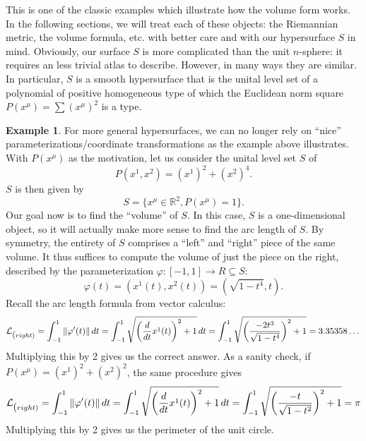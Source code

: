 \documentclass{article}
\theoremstyle{definition}
\newtheorem{exmp}{Example}[section]
\newcommand{\R}{\mathbb{R}}
\newcommand{\lag}{\mathcal{L}}
\newcommand{\f}[2]{\frac{#1}{#2}}
\newcommand{\lp}{\left(}
\newcommand{\rp}{\right)}
\theoremstyle{theorem}
\begin{document}
This is one of the classic examples which illustrate how the volume form works. In the following sections, we will treat each of these objects: the Riemannian metric, the volume formula, etc. with better care and with our hypersurface $S$ in mind. Obviously, our surface $S$ is more complicated than the unit $n$-sphere: it requires an less trivial atlas to describe. However, in many ways they are similar. In particular, $S$ is a smooth hypersurface that is the unital level set of a polynomial of positive homogeneous type of which the Euclidean norm square $P(x^\mu) = \sum (x^\mu)^2$ is a type. 




\begin{exmp}

For more general hypersurfaces, we can no longer rely on ``nice'' parameterizations/coordinate transformations as the example above illustrates. With $P(x^\mu)$ as the motivation, let us consider the unital level set $S$ of 
\begin{equation}
    P(x^1, x^2) = (x^1)^2 + (x^2)^4.
\end{equation}
$S$ is then given by
\begin{equation}
    S = \{ x^\mu \in \R^2, P(x^\mu) = 1 \}. 
\end{equation}
Our goal now is to find the ``volume'' of $S$. In this case, $S$ is a one-dimensional object, so it will actually make more sense to find the arc length of $S$. By symmetry, the entirety of $S$ comprises a ``left'' and ``right'' piece of the same volume. It thus suffices to compute the volume of just the piece on the right, described by the parameterization $\varphi : [-1,1] \to R\subseteq S$:
\begin{equation*}
    \varphi(t) = (x^1(t), x^2(t) ) = (\sqrt{1 - t^4}, t).
\end{equation*}
Recall the arc length formula from vector calculus:
\begin{equation}
    \lag_{\mbox(\tiny{right})} = \int^1_{-1} \norm{\varphi'(t)}\,dt = \int^1_{-1} \sqrt{ \lp \f{d}{dt} x^1(t) \rp^2  + 1 }\,dt = \int^1_{-1} \sqrt{ \lp \f{-2t^3}{\sqrt{1-t^4}} \rp^2 + 1} = 3.35358\dots
\end{equation}
Multiplying this by 2 gives us the correct answer. As a sanity check, if $P(x^\mu) = (x^1)^2 + (x^2)^2$, the same procedure gives 
\begin{equation}
    \lag_{\mbox(\tiny{right})} = \int^1_{-1} \norm{\varphi'(t)}\,dt = \int^1_{-1} \sqrt{ \lp \f{d}{dt} x^1(t) \rp^2  + 1 }\,dt = \int^1_{-1} \sqrt{ \lp \f{-t}{\sqrt{1-t^2}} \rp^2 + 1} = \pi
\end{equation}
Multiplying this by 2 gives us the perimeter of the unit circle. 
\end{exmp}
\end{document}
